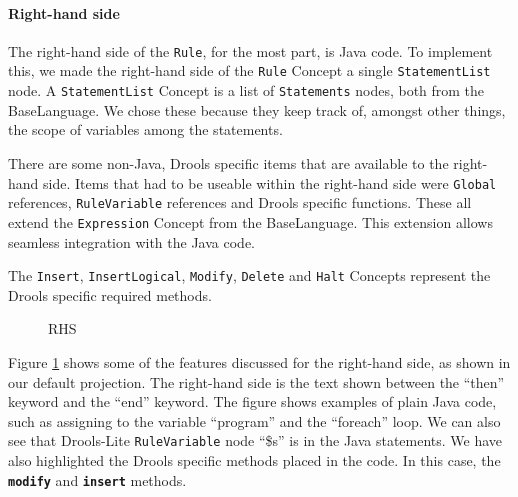 \paragraph{Right-hand side} The right-hand side of the \texttt{Rule}, for the most part, is Java code.
To implement this, we made the right-hand side of the \texttt{Rule} Concept a single \texttt{StatementList} node.
A \texttt{StatementList} Concept is a list of \texttt{Statements} nodes, both from the BaseLanguage.
We chose these because they keep track of, amongst other things, the scope of variables among the statements.

There are some non-Java, Drools specific items that are available to the right-hand side.
Items that had to be useable within the right-hand side were \texttt{Global} references, \texttt{RuleVariable} references and Drools specific functions.
These all extend the \texttt{Expression} Concept from the BaseLanguage.
This extension allows seamless integration with the Java code.

The \texttt{Insert}, \texttt{InsertLogical}, \texttt{Modify}, \texttt{Delete} and \texttt{Halt} Concepts represent the Drools specific required methods.

\begin{figure}[H]
    \centering
    \caption{RHS}
    \label{fig:RHS}
\end{figure}

Figure \ref{fig:RHS} shows some of the features discussed for the right-hand side, as shown in our default projection.
The right-hand side is the text shown between the ``then'' keyword and the ``end'' keyword.
The figure shows examples of plain Java code, such as assigning to the variable ``program'' and the ``foreach'' loop.
We can also see that Drools-Lite \texttt{RuleVariable} node ``\$s'' is in the Java statements.
We have also highlighted the Drools specific methods placed in the code.
In this case, the \texttt{\textbf{modify}} and \texttt{\textbf{insert}} methods.   

